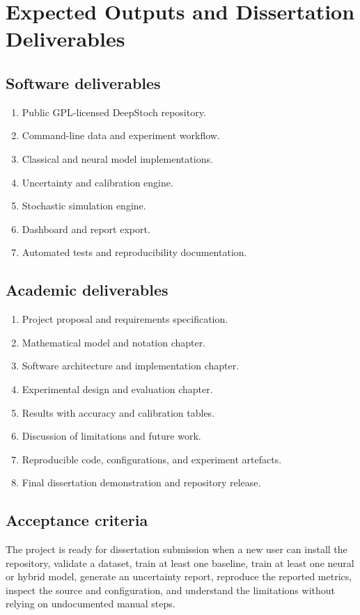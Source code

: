 \documentclass[11pt,a4paper]{report}
\begin{document}
\chapter{Expected Outputs and Dissertation Deliverables}
\section{Software deliverables}
\begin{enumerate}[leftmargin=*]
\item Public GPL-licensed DeepStoch repository.
\item Command-line data and experiment workflow.
\item Classical and neural model implementations.
\item Uncertainty and calibration engine.
\item Stochastic simulation engine.
\item Dashboard and report export.
\item Automated tests and reproducibility documentation.
\end{enumerate}

\section{Academic deliverables}
\begin{enumerate}[leftmargin=*]
\item Project proposal and requirements specification.
\item Mathematical model and notation chapter.
\item Software architecture and implementation chapter.
\item Experimental design and evaluation chapter.
\item Results with accuracy and calibration tables.
\item Discussion of limitations and future work.
\item Reproducible code, configurations, and experiment artefacts.
\item Final dissertation demonstration and repository release.
\end{enumerate}

\section{Acceptance criteria}
The project is ready for dissertation submission when a new user can install the repository, validate a dataset, train at least one baseline, train at least one neural or hybrid model, generate an uncertainty report, reproduce the reported metrics, inspect the source and configuration, and understand the limitations without relying on undocumented manual steps.
\end{document}
